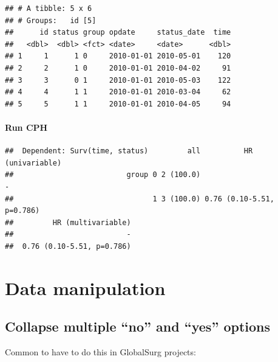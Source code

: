 \documentclass[
]{book}
\newenvironment{Shaded}{\begin{snugshade}}{\end{snugshade}}
\newcommand{\KeywordTok}[1]{\textcolor[rgb]{0.13,0.29,0.53}{\textbf{#1}}}
\newcommand{\NormalTok}[1]{#1}
\newcommand{\OperatorTok}[1]{\textcolor[rgb]{0.81,0.36,0.00}{\textbf{#1}}}
\newcommand{\StringTok}[1]{\textcolor[rgb]{0.31,0.60,0.02}{#1}}
\begin{document}
\begin{verbatim}
## # A tibble: 5 x 6
## # Groups:   id [5]
##      id status group opdate     status_date  time
##   <dbl>  <dbl> <fct> <date>     <date>      <dbl>
## 1     1      1 0     2010-01-01 2010-05-01    120
## 2     2      1 0     2010-01-01 2010-04-02     91
## 3     3      0 1     2010-01-01 2010-05-03    122
## 4     4      1 1     2010-01-01 2010-03-04     62
## 5     5      1 1     2010-01-01 2010-04-05     94
\end{verbatim}

\hypertarget{run-cph}{%
\subsubsection{Run CPH}\label{run-cph}}

\begin{Shaded}
\end{Shaded}

\begin{verbatim}
##  Dependent: Surv(time, status)         all          HR (univariable)
##                          group 0 2 (100.0)                         -
##                                1 3 (100.0) 0.76 (0.10-5.51, p=0.786)
##         HR (multivariable)
##                          -
##  0.76 (0.10-5.51, p=0.786)
\end{verbatim}

\hypertarget{data-manipulation}{%
\chapter{Data manipulation}\label{data-manipulation}}

\hypertarget{collapse-multiple-no-and-yes-options}{%
\section{Collapse multiple ``no'' and ``yes'' options}\label{collapse-multiple-no-and-yes-options}}

Common to have to do this in GlobalSurg projects:
\end{document}
